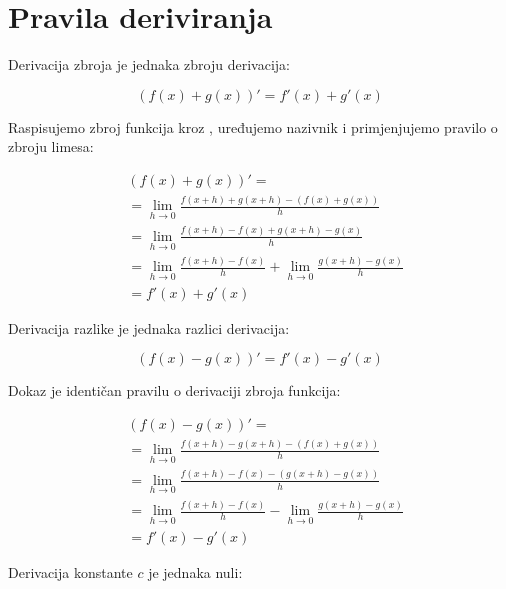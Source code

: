 \section{Pravila deriviranja}

\begin{multicols}{2}

\begin{propositionbox}
    Derivacija zbroja je jednaka zbroju derivacija:

    $$
        (f(x)+g(x))' = f'(x) + g'(x)
    $$
\end{propositionbox}

Raspisujemo zbroj funkcija kroz ,
uređujemo nazivnik i primjenjujemo pravilo o zbroju limesa:

\begin{align*}
    &(f(x)+g(x))'=\\
    &=\lim_{h\to 0}\frac{f(x+h)+g(x+h)-(f(x)+g(x))}{h}\\
    &=\lim_{h\to 0}\frac{f(x+h)-f(x)+g(x+h)-g(x)}{h}\\
    &=\lim_{h\to 0}\frac{f(x+h)-f(x)}{h} + \lim_{h\to 0}\frac{g(x+h)-g(x)}{h}\\
    &=f'(x) + g'(x)
\end{align*}

\begin{propositionbox}
    Derivacija razlike je jednaka razlici derivacija:

    $$
        (f(x)-g(x))' = f'(x) - g'(x)
    $$
\end{propositionbox}

Dokaz je identičan pravilu o derivaciji zbroja funkcija:

\begin{align*}
    &(f(x)-g(x))'=\\
    &=\lim_{h\to 0}\frac{f(x+h)-g(x+h)-(f(x)+g(x))}{h}\\
    &=\lim_{h\to 0}\frac{f(x+h)-f(x)-(g(x+h)-g(x))}{h}\\
    &=\lim_{h\to 0}\frac{f(x+h)-f(x)}{h} - \lim_{h\to 0}\frac{g(x+h)-g(x)}{h}\\
    &=f'(x) - g'(x)
\end{align*}

\newcolumn

\begin{propositionbox}
    Derivacija konstante $c$ je jednaka nuli:


\end{propositionbox}
\end{multicols}
